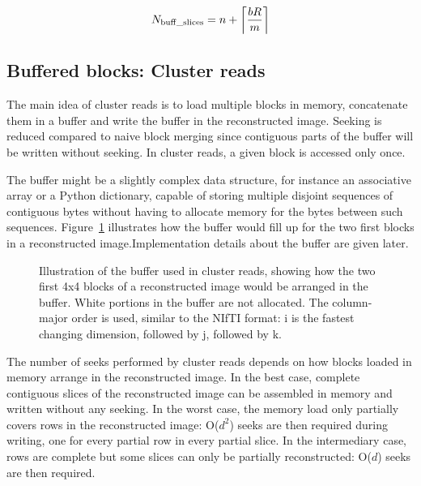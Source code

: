 \documentclass[10pt, conference, compsocconf]{IEEEtran}
\DeclarePairedDelimiter{\ceil}{\lceil}{\rceil}
\begin{document}
\begin{equation}
N_\mathrm{buff\_slices} =  n + \ceil*{\frac{bR}{m}}
\end{equation}


\subsection{Buffered blocks: Cluster reads}

The main idea of cluster reads is to load multiple blocks in memory,
concatenate them in a buffer and write the buffer in the reconstructed
image. Seeking is reduced compared to naive block merging since
contiguous parts of the buffer will be written without seeking. In
cluster reads, a given block is accessed only once. 

The buffer might be a
slightly complex data structure, for instance an associative array or
a Python dictionary, capable of storing multiple disjoint sequences of
contiguous bytes without having to allocate memory for the bytes
between such sequences. Figure~\ref{fig:cluster-reads-buffer}
illustrates how the buffer would fill up for the two first blocks in a reconstructed image.Implementation details about the
buffer are given later.
\begin{figure}
\centering
\def\svgwidth{0.3\columnwidth}

\caption{Illustration of the buffer used in cluster reads, showing how
  the two first 4x4 blocks of a reconstructed image would be arranged
  in the buffer.  White portions in the buffer are not allocated.  The
  column-major order is used, similar to the NIfTI format: i is the
  fastest changing dimension, followed by j, followed by k.}
\label{fig:cluster-reads-buffer}
\end{figure}

The number of seeks performed by cluster reads depends on how blocks
loaded in memory arrange in the reconstructed image. In the best case,
complete contiguous slices of the reconstructed image can be assembled
in memory and written without any seeking. In the worst case, the
memory load only partially covers rows in the reconstructed image:
O($d^2$) seeks are then required during writing, one for every partial
row in every partial slice. In the intermediary case, rows are
complete but some slices can only be partially reconstructed: O($d$)
seeks are then required.
\end{document}
